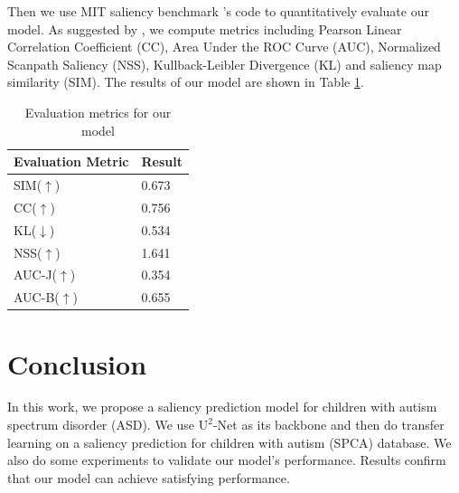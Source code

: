 \documentclass[journal]{IEEEtran}
\begin{document}
Then we use MIT saliency benchmark \cite{mit-saliency-benchmark}'s code to quantitatively evaluate our model. As suggested by \cite{salMetrics_Bylinskii}, we compute metrics including Pearson Linear Correlation Coefficient (CC), Area Under the ROC Curve (AUC), Normalized Scanpath Saliency (NSS), Kullback-Leibler Divergence (KL) and saliency map similarity (SIM). The results of our model are shown in Table \ref{tab:metrics}. 

\begin{table}[]
\centering
\caption{Evaluation metrics for our model}\label{tab:metrics}
\begin{tabular}{ll}
\toprule
Evaluation Metric & Result \\
\midrule
SIM($\uparrow$)             & 0.673  \\
CC($\uparrow$)                & 0.756  \\
KL($\downarrow$)                & 0.534  \\
NSS($\uparrow$)               & 1.641  \\
AUC-J($\uparrow$)             & 0.354  \\
AUC-B($\uparrow$)            & 0.655 \\
\bottomrule
\end{tabular}
\end{table}

\section{Conclusion}
In this work, we propose a saliency prediction model for children with autism spectrum disorder (ASD). We use $\text{U}^{2}$-Net as its backbone and then do transfer learning on a saliency prediction for children with autism (SPCA) database. We also do some experiments to validate our model's performance. Results confirm that our model can achieve satisfying performance.





\end{document}
